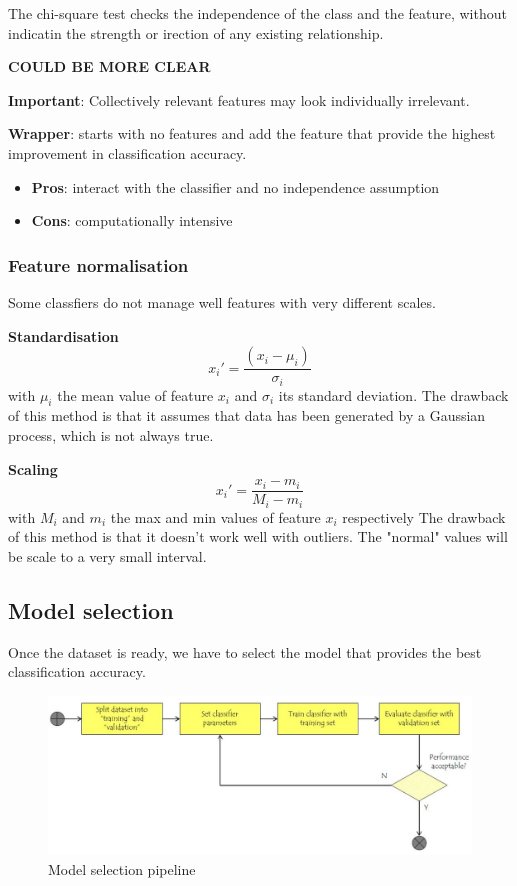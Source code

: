 The chi-square test checks the independence of the class and the feature, without indicatin the strength or irection of any existing relationship.

\textbf{COULD BE MORE CLEAR}

\textbf{Important}: Collectively relevant features may look individually irrelevant.

\textbf{Wrapper}: starts with no features and add the feature that provide the highest improvement in classification accuracy.
\begin{itemize}
	\item \textbf{Pros}: interact with the classifier and no independence assumption
	\item \textbf{Cons}: computationally intensive
\end{itemize}

\subsubsection*{Feature normalisation}
Some classfiers do not manage well features with very different scales.

\textbf{Standardisation}
\[
	x_i' = \frac{(x_i - \mu_i)}{\sigma_i}
\]
with $\mu_i$ the mean value of feature $x_i$ and $\sigma_i$ its standard deviation.
The drawback of this method is that it assumes that data has been generated by a Gaussian process, which is not always true.

\textbf{Scaling}
\[
	x_i' = \frac{x_i - m_i}{M_i - m_i}
\]
with $M_i$ and $m_i$ the max and min values of feature $x_i$ respectively
The drawback of this method is that it doesn't work well with outliers. The "normal" values will be scale to a very small interval.

\subsection{Model selection}
Once the dataset is ready, we have to select the model that provides the best classification accuracy. 

\begin{figure}[!ht]
  \centering
  \includegraphics[width=1.0\linewidth]{figures/model_selection}
  \caption{Model selection pipeline}
  \label{fig:modelSelection}
\end{figure}

